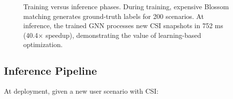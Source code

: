 \documentclass[conference]{IEEEtran}
\begin{document}
%

\begin{figure}[t]
\centering
\resizebox{\columnwidth}{!}{}
\caption{Training versus inference phases. During training, expensive Blossom matching generates ground-truth labels for 200 scenarios. At inference, the trained GNN processes new CSI snapshots in 752 ms (40.4× speedup), demonstrating the value of learning-based optimization.}
\label{fig:training_inference}
\end{figure}

\subsection{Inference Pipeline}

At deployment, given a new user scenario with CSI:
\end{document}
